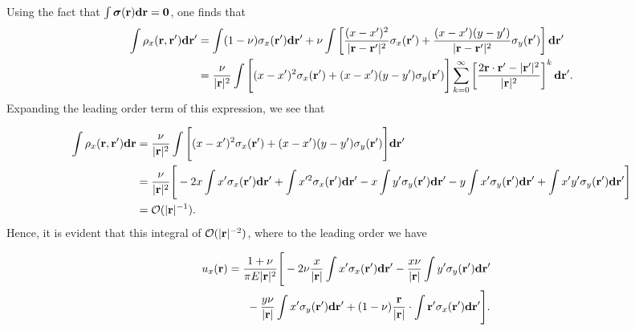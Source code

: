 \documentclass[aps,prl,reprint,twocolumn,groupedaddress,showpacs]{revtex4-1}
\newcommand{\bsigma}{{\boldsymbol\sigma}}
\def\d{{\bf d}}
\def\r{{\bf r}}
\begin{document}
\begin{widetext}
Using the fact that $\int \bsigma(\r)\d\r = \mathbf{0}$, one finds that
%
\begin{align}
\int \rho_{x}(\r,\r')\d\r'  & =  \int (1-\nu)\sigma_x(\r')\d\r'
+\nu\int\left[\frac{(x - x')^2}{|\r-\r'|^2} \sigma_{x}(\r') +
\frac{(x-x')(y-y')}{|\r-\r'|^2} \sigma_y(\r')  \right]\d\r' \nonumber\\
\: &= \frac{\nu}{|\r|^2}\int\Bigg[(x - x')^2\sigma_{x}(\r')
+ (x-x')(y-y')\sigma_y(\r')  \Bigg]
\sum_{k=0}^\infty \left[\frac{2\r\cdot\r' - |\r'|^2}{|\r|^2} \right]^k \d\r'.
\end{align}
%
Expanding the leading order term of this expression, we see that

\begin{align*}
\int\rho_{x}(\r,\r')\d\r 
&= \frac{\nu}{|\r|^2}\int\Bigg[(x- x')^2\sigma_{x}(\r')+(x-x')(y-y')\sigma_y(\r')\Bigg]
\d\r' \nonumber\\
\: &= \frac{\nu}{|\r|^2}  \Bigg[  -2x\int x'\sigma_x(\r')\d\r'  + \int x'^2\sigma_x(\r')\d\r'- x\int y' \sigma_y(\r') \d\r'- y\int x'\sigma_y(\r')\d\r'
+ \int x'y' \sigma_y(\r') \d\r'\Bigg] \nonumber \\
\: & =\mathcal{O}(|\r|^{-1}).
\end{align*}
%
Hence, it is evident that this integral of $\mathcal{O}(|\r|^{-2})$,
where to the leading order we have

\begin{align}
\lefteqn{u_x(\r) = \frac{1+\nu}{\pi E |\r|^2}
\Bigg[ -2\nu\frac{x}{|\r|}\int x'\sigma_x(\r')\d\r'
-\frac{x\nu}{|\r|}\int y' \sigma_y(\r') \d\r'  }\nonumber\\
&\qquad\qquad- \frac{y\nu}{|\r|}\int x'\sigma_y(\r')\d\r' 
+ (1-\nu)\frac{\r}{|\r|}\cdot\int \r'\sigma_x(\r') \d\r'\Bigg].
\end{align}



\end{widetext}
\end{document}
